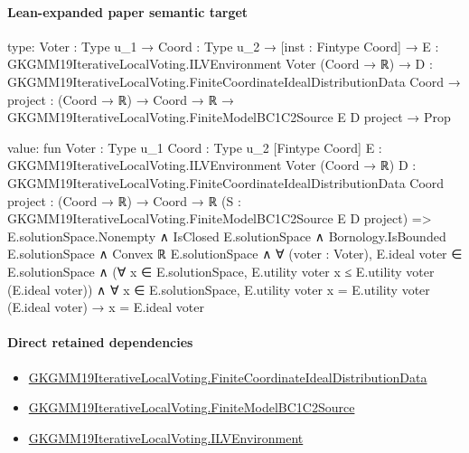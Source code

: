 \documentclass[10pt]{article}
\begin{document}
\paragraph{Lean-expanded paper semantic target}
\begin{ReviewVerbatim}
type:
{Voter : Type u_1} →
  {Coord : Type u_2} →
    [inst : Fintype Coord] →
      {E : GKGMM19IterativeLocalVoting.ILVEnvironment Voter (Coord → ℝ)} →
        {D : GKGMM19IterativeLocalVoting.FiniteCoordinateIdealDistributionData Coord} →
          {project : (Coord → ℝ) → Coord → ℝ} → GKGMM19IterativeLocalVoting.FiniteModelBC1C2Source E D project → Prop

value:
fun {Voter : Type u_1} {Coord : Type u_2} [Fintype Coord]
    {E : GKGMM19IterativeLocalVoting.ILVEnvironment Voter (Coord → ℝ)}
    {D : GKGMM19IterativeLocalVoting.FiniteCoordinateIdealDistributionData Coord} {project : (Coord → ℝ) → Coord → ℝ}
    (S : GKGMM19IterativeLocalVoting.FiniteModelBC1C2Source E D project) =>
  E.solutionSpace.Nonempty ∧
    IsClosed E.solutionSpace ∧
      Bornology.IsBounded E.solutionSpace ∧
        Convex ℝ E.solutionSpace ∧
          ∀ (voter : Voter),
            E.ideal voter ∈ E.solutionSpace ∧
              (∀ x ∈ E.solutionSpace, E.utility voter x ≤ E.utility voter (E.ideal voter)) ∧
                ∀ x ∈ E.solutionSpace, E.utility voter x = E.utility voter (E.ideal voter) → x = E.ideal voter
\end{ReviewVerbatim}

\paragraph{Direct retained dependencies}
\begin{itemize}\raggedright
\item \hyperlink{governing-declaration-57171116eb928bf6}{GKGMM19\allowbreak{}Iterative\allowbreak{}Local\allowbreak{}Voting.\allowbreak{}Finite\allowbreak{}Coordinate\allowbreak{}Ideal\allowbreak{}Distribution\allowbreak{}Data}
\item \hyperlink{governing-declaration-b2172f203bb89b25}{GKGMM19\allowbreak{}Iterative\allowbreak{}Local\allowbreak{}Voting.\allowbreak{}Finite\allowbreak{}Model\allowbreak{}BC1\allowbreak{}C2\allowbreak{}Source}
\item \hyperlink{governing-declaration-df2ca62df1846667}{GKGMM19\allowbreak{}Iterative\allowbreak{}Local\allowbreak{}Voting.\allowbreak{}ILV\allowbreak{}Environment}
\end{itemize}
\end{document}
